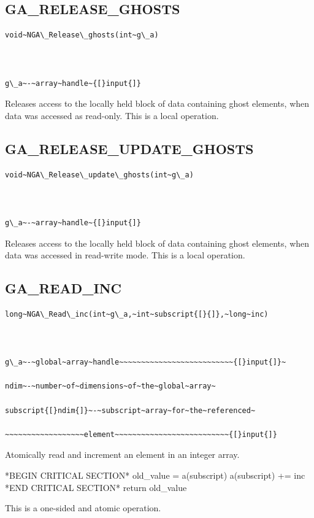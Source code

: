 \subsection*{\label{sub:GA_RELEASE_GHOSTS}GA\_RELEASE\_GHOSTS}
\begin{verbatim}
void~NGA\_Release\_ghosts(int~g\_a)



g\_a~-~array~handle~{[}input{]}
\end{verbatim}
Releases access to the locally held block of data containing ghost
elements, when data was accessed as read-only. This is a local operation. 


\subsection*{\label{sub:GA_RELEASE_UPDATE_GHOSTS}GA\_RELEASE\_UPDATE\_GHOSTS}
\begin{verbatim}
void~NGA\_Release\_update\_ghosts(int~g\_a)



g\_a~-~array~handle~{[}input{]}
\end{verbatim}
Releases access to the locally held block of data containing ghost
elements, when data was accessed in read-write mode. This is a local
operation. 


\subsection*{\label{sub:GA_READ_INC}GA\_READ\_INC}
\begin{verbatim}
long~NGA\_Read\_inc(int~g\_a,~int~subscript{[}{]},~long~inc)



g\_a~-~global~array~handle~~~~~~~~~~~~~~~~~~~~~~~~~~{[}input{]}~

ndim~-~number~of~dimensions~of~the~global~array~

subscript{[}ndim{]}~-~subscript~array~for~the~referenced~

~~~~~~~~~~~~~~~~~~element~~~~~~~~~~~~~~~~~~~~~~~~~~{[}input{]}
\end{verbatim}
Atomically read and increment an element in an integer array.

{*}BEGIN CRITICAL SECTION{*} old\_value = a(subscript) a(subscript)
+= inc {*}END CRITICAL SECTION{*} return old\_value

This is a one-sided and atomic operation. 


